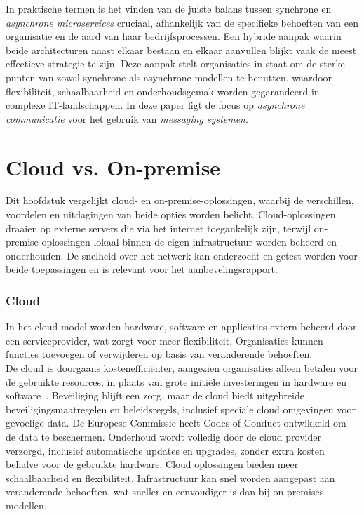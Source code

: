 In praktische termen is het vinden van de juiste balans tussen synchrone en \emph{asynchrone microservices} cruciaal, 
afhankelijk van de specifieke behoeften van een organisatie en de aard van haar bedrijfsprocessen. 
Een hybride aanpak waarin beide architecturen naast elkaar bestaan en elkaar aanvullen blijkt vaak de meest effectieve strategie te zijn. 
Deze aanpak stelt organisaties in staat om de sterke punten van zowel synchrone als asynchrone modellen te benutten, 
waardoor flexibiliteit, schaalbaarheid en onderhoudsgemak worden gegarandeerd in complexe \newline IT-landschappen.
In deze paper ligt de focus op \emph{asynchrone communicatie} voor het gebruik van \emph{messaging systemen}.
\newline

\section{Cloud vs. On-premise}
Dit hoofdstuk vergelijkt cloud- en on-premise-oplossingen, waarbij de verschillen, voordelen en uitdagingen van beide opties worden belicht. 
Cloud-oplossingen draaien op externe servers die via het internet toegankelijk zijn, 
terwijl on-premise-oplossingen lokaal binnen de eigen infrastructuur worden beheerd en onderhouden.
De snelheid over het netwerk kan onderzocht en getest worden voor beide toepassingen en is relevant voor het aanbevelingsrapport.

\subsubsection{Cloud}
In het cloud model worden hardware, software en applicaties extern beheerd door een serviceprovider, wat zorgt voor meer flexibiliteit. 
Organisaties kunnen functies toevoegen of verwijderen op basis van veranderende behoeften.
\\
De cloud is doorgaans kostenefficiënter, aangezien organisaties alleen betalen voor de gebruikte resources, 
in plaats van grote initiële investeringen in hardware en software~\autocite{Golec2021}.
Beveiliging blijft een zorg, maar de cloud biedt uitgebreide beveiligingsmaatregelen en beleidsregels, inclusief speciale cloud omgevingen voor gevoelige data. 
De Europese Commissie heeft Codes of Conduct ontwikkeld om de data te beschermen.
Onderhoud wordt volledig door de cloud provider verzorgd, inclusief automatische updates en upgrades, zonder extra kosten behalve voor de gebruikte hardware.
Cloud oplossingen bieden meer schaalbaarheid en flexibiliteit. 
Infrastructuur kan snel worden aangepast aan veranderende behoeften, wat sneller en eenvoudiger is dan bij on-premises modellen.

